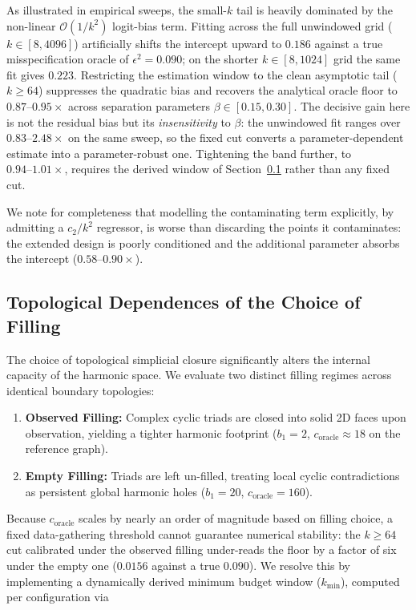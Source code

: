 As illustrated in empirical sweeps, the small-$k$ tail is heavily dominated by
the non-linear $\mathcal{O}(1/k^2)$ logit-bias term. Fitting across the full
unwindowed grid ($k \in [8, 4096]$) artificially shifts the intercept upward to
$0.186$ against a true misspecification oracle of $\epsilon^2 = 0.090$; on the
shorter $k \in [8, 1024]$ grid the same fit gives $0.223$.
Restricting the estimation window to the clean asymptotic tail ($k \ge 64$)
suppresses the quadratic bias and recovers the analytical oracle floor to
$0.87\text{--}0.95\times$ across separation parameters $\beta \in [0.15, 0.30]$.
The decisive gain here is not the residual bias but its \emph{insensitivity} to
$\beta$: the unwindowed fit ranges over $0.83\text{--}2.48\times$ on the same
sweep, so the fixed cut converts a parameter-dependent estimate into a
parameter-robust one. Tightening the band further, to
$0.94\text{--}1.01\times$, requires the derived window of
Section~\ref{subsec:filling} rather than any fixed cut.

We note for completeness that modelling the contaminating term explicitly, by
admitting a $c_2/k^2$ regressor, is worse than discarding the points it
contaminates: the extended design is poorly conditioned and the additional
parameter absorbs the intercept ($0.58\text{--}0.90\times$).

\subsection{Topological Dependences of the Choice of Filling}
\label{subsec:filling}
The choice of topological simplicial closure significantly alters the internal
capacity of the harmonic space. We evaluate two distinct filling regimes across
identical boundary topologies:

\begin{enumerate}
    \item \textbf{Observed Filling:} Complex cyclic triads are closed into solid
    2D faces upon observation, yielding a tighter harmonic footprint
    ($b_1 = 2$, $c_{\text{oracle}} \approx 18$ on the reference graph).
    \item \textbf{Empty Filling:} Triads are left un-filled, treating local
    cyclic contradictions as persistent global harmonic holes
    ($b_1 = 20$, $c_{\text{oracle}} = 160$).
\end{enumerate}

Because $c_{\text{oracle}}$ scales by nearly an order of magnitude based on
filling choice, a fixed data-gathering threshold cannot guarantee numerical
stability: the $k \ge 64$ cut calibrated under the observed filling under-reads
the floor by a factor of six under the empty one ($0.0156$ against a true
$0.090$). We resolve this by implementing a dynamically derived minimum budget
window ($k_{\min}$), computed per configuration via

